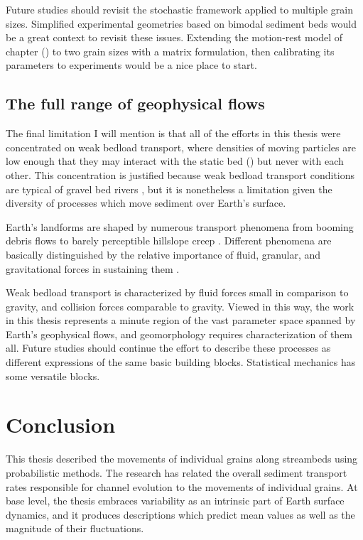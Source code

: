 Future studies should revisit the stochastic framework applied to multiple grain sizes. Simplified experimental geometries based on bimodal sediment beds \citep[e.g.][]{Houssais2012} would be a great context to revisit these issues. Extending the motion-rest model of chapter () to two grain sizes with a matrix formulation, then calibrating its parameters to experiments would be a nice place to start.

\subsection{The full range of geophysical flows}

The final limitation I will mention is that all of the efforts in this thesis were concentrated on weak bedload transport, where densities of moving particles are low enough that they may interact with the static bed () but never with each other. This concentration is justified because weak bedload transport conditions are typical of gravel bed rivers \citep{Ashworth1989,Warburton1992}, but it is nonetheless a limitation given the diversity of processes which move sediment over Earth's surface.

Earth's landforms are shaped by numerous transport phenomena from booming debris flows \citep{Iverson1997} to barely perceptible hillslope creep \citep{Deshpande2021}.
Different phenomena are basically distinguished by the relative importance of fluid, granular, and gravitational forces in sustaining them \citep{Jerolmack2019}.

Weak bedload transport is characterized by fluid forces small in comparison to gravity, and collision forces comparable to gravity.
Viewed in this way, the work in this thesis represents a minute region of the vast parameter space spanned by Earth's geophysical flows, and geomorphology requires characterization of them all.
Future studies should continue the effort \citep{Furbish2021a} to describe these processes as different expressions of the same basic building blocks. 
Statistical mechanics has some versatile blocks. 


\section{Conclusion}

This thesis described the movements of individual grains along streambeds using probabilistic methods.
The research has related the overall sediment transport rates responsible for channel evolution to the movements of individual grains.
At base level, the thesis embraces variability as an intrinsic part of Earth surface dynamics, and it produces descriptions which predict mean values as well as the magnitude of their fluctuations.

